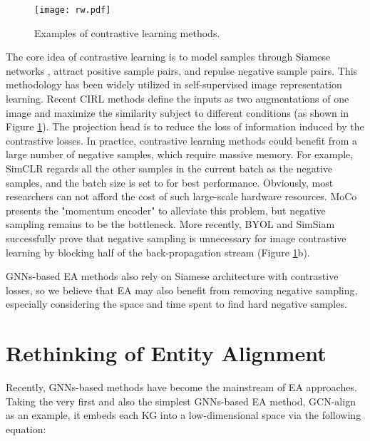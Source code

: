 \documentclass[sigconf]{acmart}
\begin{document}
\begin{figure}
  \centering
  \texttt{[image: rw.pdf]}
  \caption{Examples of contrastive learning methods.\protect\footnotemark}
  \label{fig:rw}
\end{figure}
The core idea of contrastive learning is to model samples through Siamese networks \cite{DBLP:conf/nips/BromleyGLSS93}, attract positive sample pairs, and repulse negative sample pairs.
This methodology has been widely utilized in self-supervised image representation learning.
Recent CIRL\cite{DBLP:conf/icml/ChenK0H20,DBLP:conf/nips/GrillSATRBDPGAP20,DBLP:journals/corr/abs-2011-10566} methods define the inputs as two augmentations of one image and maximize the similarity subject to different conditions (as shown in Figure \ref{fig:rw}).
The projection head is to reduce the loss of information induced by the contrastive losses. 
In practice, contrastive learning methods could benefit from a large number of negative samples, which require massive memory.
For example, SimCLR \cite{DBLP:conf/icml/ChenK0H20} regards all the other samples in the current batch as the negative samples, and the batch size is set to  for best performance.
Obviously, most researchers can not afford the cost of such large-scale hardware resources.
MoCo \cite{DBLP:conf/cvpr/He0WXG20} presents the "momentum encoder" to alleviate this problem, but negative sampling remains to be the bottleneck.
More recently, BYOL \cite{DBLP:conf/nips/GrillSATRBDPGAP20} and SimSiam \cite{DBLP:journals/corr/abs-2011-10566} successfully prove that negative sampling is unnecessary for image contrastive learning by blocking half of the back-propagation stream (Figure \ref{fig:rw}b).

GNNs-based EA methods also rely on Siamese architecture with contrastive losses, so we believe that EA may also benefit from removing negative sampling, especially considering the space and time spent to find hard negative samples.

\section{Rethinking of Entity Alignment}
Recently, GNNs-based methods have become the mainstream of EA approaches.
Taking the very first and also the simplest GNNs-based EA method, GCN-align \cite{DBLP:conf/emnlp/WangLLZ18} as an example, it embeds each KG into a low-dimensional space via the following equation:
\end{document}
